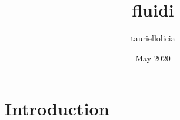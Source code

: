 \documentclass{article}
\title{fluidi}
\author{tauriellolicia }
\date{May 2020}
\begin{document}
\maketitle

\section{Introduction}
\end{document}
